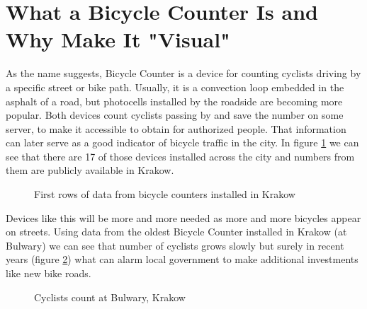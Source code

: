 \section{What a Bicycle Counter Is and Why Make It "Visual"}
\label{sec:why}

As the name suggests, Bicycle Counter is a device for counting cyclists driving by a specific street or bike path. Usually, it is a convection loop embedded in the asphalt of a road, but photocells installed by the roadside are becoming more popular. Both devices count cyclists passing by and save the number on some server, to make it accessible to obtain for authorized people. That information can later serve as a good indicator of bicycle traffic in the city. In figure \ref{fig:countersKrakow} we can see that there are 17 of those devices installed across the city and numbers from them are publicly available in Krakow.
\begin{figure}[H]
    \centering
    \caption{First rows of data from bicycle counters installed in Krakow \cite{liczniki}}
    \label{fig:countersKrakow}
\end{figure}
Devices like this will be more and more needed as more and more bicycles appear on streets. Using data from the oldest Bicycle Counter installed in Krakow (at Bulwary)\cite{liczniki} we can see that number of cyclists grows slowly but surely in recent years (figure \ref{fig:graph3}) what can alarm local government to make additional investments like new bike roads.
\begin{figure}[H]
    \centering
    \caption{Cyclists count at Bulwary, Krakow}
    \label{fig:graph3}
\end{figure}
